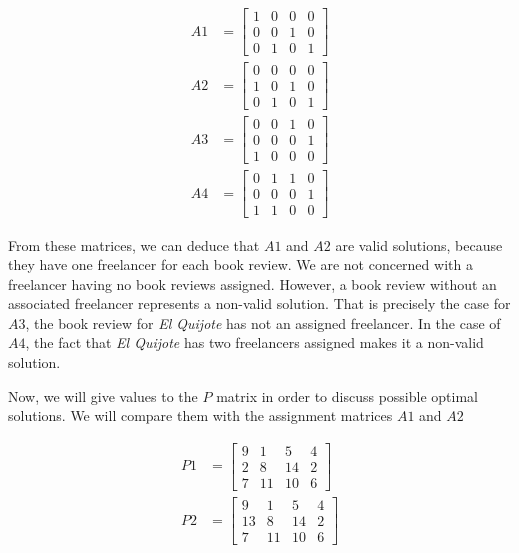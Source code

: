 \begin{align}
    A1 &= 
    \begin{bmatrix}
        1 & 0 & 0 & 0\\ 
        0 & 0 & 1 & 0\\ 
        0 & 1 & 0 & 1
    \end{bmatrix} \\
    A2 &= 
    \begin{bmatrix}
        0 & 0 & 0 & 0\\ 
        1 & 0 & 1 & 0\\ 
        0 & 1 & 0 & 1 
    \end{bmatrix} \\
    A3 &= 
    \begin{bmatrix}
        0 & 0 & 1 & 0\\ 
        0 & 0 & 0 & 1\\ 
        1 & 0 & 0 & 0 
    \end{bmatrix} \\
    A4 &= 
    \begin{bmatrix}
        0 & 1 & 1 & 0\\ 
        0 & 0 & 0 & 1\\ 
        1 & 1 & 0 & 0 
    \end{bmatrix}
\end{align}

From these matrices, we can deduce that $A1$ and $A2$ are valid solutions, because they have one freelancer for each book review. We are not concerned with a freelancer having no book reviews assigned. However, a book review without an associated freelancer represents a non-valid solution. That is precisely the case for $A3$, the book review for \textit{El Quijote} has not an assigned freelancer. In the case of $A4$, the fact that \textit{El Quijote} has two freelancers assigned makes it a non-valid solution.

Now, we will give values to the $P$ matrix in order to discuss possible optimal solutions. We will compare them with the assignment matrices $A1$ and $A2$

\begin{align}
    P1 &= 
    \begin{bmatrix}
        9 & 1 & 5 & 4\\ 
        2 & 8 & 14 & 2\\ 
        7 & 11 & 10 & 6
    \end{bmatrix} \\
    P2 &= 
    \begin{bmatrix}
        9 & 1 & 5 & 4\\ 
        13 & 8 & 14 & 2\\ 
        7 & 11 & 10 & 6
    \end{bmatrix}
\end{align}

